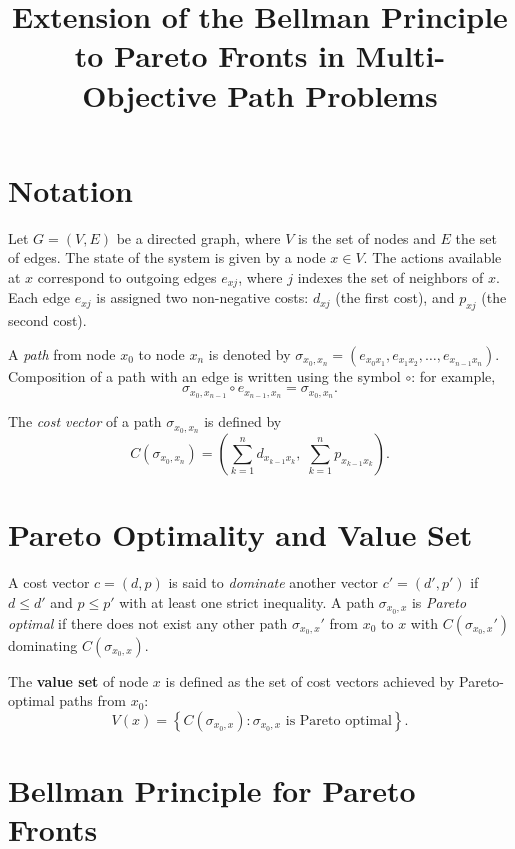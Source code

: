 \documentclass{article}
\title{Extension of the Bellman Principle to Pareto Fronts in Multi-Objective Path Problems}
\author{}
\begin{document}
\maketitle

\section{Notation}

Let $G = (V, E)$ be a directed graph, where $V$ is the set of nodes and $E$ the set of edges. The state of the system is given by a node $x \in V$. The actions available at $x$ correspond to outgoing edges $e_{xj}$, where $j$ indexes the set of neighbors of $x$. Each edge $e_{xj}$ is assigned two non-negative costs: $d_{xj}$ (the first cost), and $p_{xj}$ (the second cost).

A \emph{path} from node $x_0$ to node $x_n$ is denoted by $\sigma_{x_0,x_n} = (e_{x_0 x_1}, e_{x_1 x_2}, \ldots, e_{x_{n-1} x_n})$.  
Composition of a path with an edge is written using the symbol $\circ$: for example,
\[
\sigma_{x_0, x_{n-1}} \circ e_{x_{n-1}, x_n} = \sigma_{x_0, x_n}.
\]

The \emph{cost vector} of a path $\sigma_{x_0, x_n}$ is defined by
\begin{equation}\label{eq:path-cost}
C(\sigma_{x_0, x_n}) = \left( \sum_{k=1}^n d_{x_{k-1} x_k},\; \sum_{k=1}^n p_{x_{k-1} x_k} \right).
\end{equation}

\section{Pareto Optimality and Value Set}

A cost vector $c = (d,p)$ is said to \emph{dominate} another vector $c' = (d',p')$ if $d \leq d'$ and $p \leq p'$ with at least one strict inequality.  
A path $\sigma_{x_0, x}$ is \emph{Pareto optimal} if there does not exist any other path $\sigma_{x_0, x}'$ from $x_0$ to $x$ with $C(\sigma_{x_0, x}')$ dominating $C(\sigma_{x_0, x})$.

The \textbf{value set} of node $x$ is defined as the set of cost vectors achieved by Pareto-optimal paths from $x_0$:
\begin{equation}\label{eq:pareto-set-def}
V(x) = \left\{ C(\sigma_{x_0, x}) : \sigma_{x_0, x} \text{ is Pareto optimal} \right\}.
\end{equation}

\section{Bellman Principle for Pareto Fronts}
\end{document}
